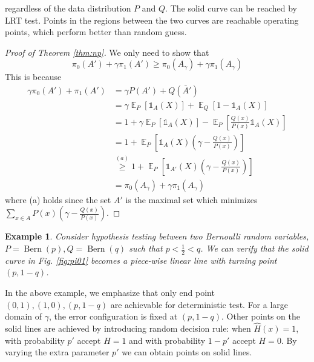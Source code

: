 \documentclass{article}
\DeclareMathOperator{\E}{\mathbb{E}}
\DeclareMathOperator{\Bern}{Bern}
\newtheorem{example}{Example}
\begin{document}
regardless of the data distribution $P$ and $Q$.
The solid curve can be reached by LRT test. Points in the 
regions between the two curves are reachable
operating points, which perform better than random guess.
\begin{proof}[Proof of Theorem \ref{thm:np}]
We only need to  show that
\begin{equation}
\pi_0(A') + \gamma \pi_1(A')
\geq \pi_0(A_{\gamma}) + \gamma \pi_1(A_{\gamma})
\end{equation}
This is because
\begin{align*}
    \gamma \pi_0(A') + \pi_1(A')
    &= \gamma P(A') +Q(\bar{A}') \\
    &= \gamma\E_P[\mathds{1}_A(X)]
    + \E_Q[1-\mathds{1}_A(X)] \\
    &=1+ \gamma \E_P[\mathds{1}_A(X)]
    - \E_P[\frac{Q(x)}{P(x)}\mathds{1}_A(X)] \\
    &=1 + \E_P[\mathds{1}_A(X)(\gamma - \frac{Q(x)}{P(x)})]\\
    &\stackrel{(a)}{\geq} 1 + \E_P[\mathds{1}_{A'}(X)(\gamma - \frac{Q(x)}{P(x)})]\\
    &=\pi_0(A_{\gamma}) + \gamma \pi_1(A_{\gamma})
\end{align*}
where (a) holds since the set $A'$ is the maximal
set which minimizes $\sum_{x\in A} P(x)(\gamma - \frac{Q(x)}{P(x)})$.
\end{proof}
\begin{example}\label{ex:1}
Consider hypothesis testing between two
Bernoulli random variables, $P=\Bern(p), Q=\Bern(q)$
such that $p<\frac{1}{2}<q$. We can verify that
the solid curve in Fig. \ref{fig:pi01} becomes
a piece-wise linear line with turning point $(p,1-q)$.
\end{example}
In the above example, we emphasize that only
end point $(0,1),(1,0),(p,1-q)$ are achievable
for deterministic test. For a large domain of
$\gamma$, the error configuration is fixed
at $(p, 1-q)$.
Other points on the
solid lines are achieved by introducing
random decision rule: when $\widehat{H}(x)=1$, with probability $p'$ accept $H=1$ and
with probability $1-p'$ accept $H=0$. By
varying the extra parameter $p'$ we can obtain
points on solid lines.
\end{document}
